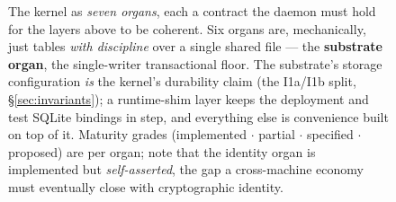 \begin{figure}[H]
{%
}
\caption{The kernel as \emph{seven organs}, each a contract the daemon must hold
for the layers above to be coherent. Six organs are, mechanically, just tables
\emph{with discipline} over a single shared file --- the \textbf{substrate organ},
the single-writer transactional floor. The substrate's storage configuration
\emph{is} the kernel's durability claim (the I1a/I1b split, \S\ref{sec:invariants});
a runtime-shim layer keeps the deployment and test SQLite bindings in step, and
everything else is convenience built on top of it. Maturity grades (\textsf{implemented} $\cdot$ \textsf{partial} $\cdot$
\textsf{specified} $\cdot$ \textsf{proposed}) are per organ; note that the identity
organ is implemented but \emph{self-asserted}, the gap a cross-machine economy must
eventually close with cryptographic identity.}
\label{fig:swk-seven-organs}
\end{figure}
